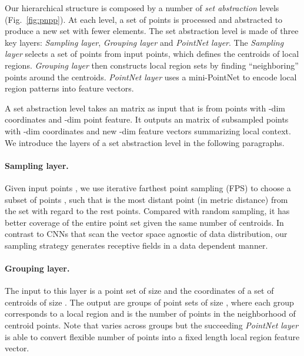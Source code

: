 \documentclass{article}
\begin{document}
Our hierarchical structure is composed by a number of \emph{set abstraction} levels (Fig.~\ref{fig:pnpp}). At each level, a set of points is processed and abstracted to produce a new set with fewer elements. The set abstraction level is made of three key layers: \emph{Sampling layer}, \emph{Grouping layer} and \emph{PointNet layer}. The \emph{Sampling layer} selects a set of points from input points, which defines the centroids of local regions. \emph{Grouping layer} then constructs local region sets by finding ``neighboring'' points around the centroids. \emph{PointNet layer} uses a mini-PointNet to encode local region patterns into feature vectors.





A set abstraction level takes an  matrix as input that is from  points with -dim coordinates and -dim point feature. It outputs an  matrix of  subsampled points with -dim coordinates and new -dim feature vectors summarizing local context. We introduce the layers of a set abstraction level in the following paragraphs.







\vspace{-0.3cm}
\paragraph{Sampling layer.}
Given input points , we use iterative farthest point sampling (FPS) to choose a subset of points , such that  is the most distant point (in metric distance) from the set  with regard to the rest points. Compared with random sampling, it has better coverage of the entire point set given the same number of centroids. In contrast to CNNs that scan the vector space agnostic of data distribution, our sampling strategy generates receptive fields in a data dependent manner. 





\vspace{-0.3cm}
\paragraph{Grouping layer.}
The input to this layer is a point set of size  and the coordinates of a set of centroids of size . The output are groups of point sets of size , where each group corresponds to a local region and  is the number of points in the neighborhood of centroid points. Note that  varies across groups but the succeeding \emph{PointNet layer} is able to convert flexible number of points into a fixed length local region feature vector.
\end{document}
